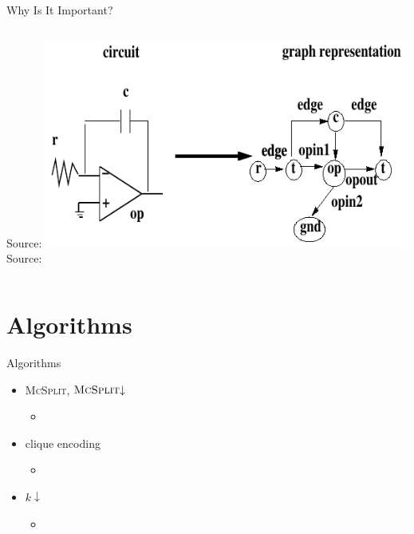\documentclass{beamer}
\begin{document}
\begin{frame}{Why Is It Important?}
\begin{columns}[t]
\begin{column}{0.5\textwidth}
      {\tiny Source: \cite{grindley}}
      \includegraphics[width=0.9\textwidth,height=0.4\textheight,keepaspectratio]{electronics2.png} \\[-7pt]
      {\tiny Source: \cite{617051}}
    \end{column}
  \end{columns}
\end{frame}

\section{Algorithms}

\begin{frame}{Algorithms}
  \begin{itemize}
  \item \textsc{McSplit}, $\textsc{McSplit}{\downarrow}$
    \begin{itemize}
    \item \cite{DBLP:conf/ijcai/McCreeshPT17}
    \end{itemize}
  \item clique encoding
    \begin{itemize}
    \item \cite{DBLP:conf/cp/McCreeshNPS16}
    \end{itemize}
  \item $k{\downarrow}$
    \begin{itemize}
    \item \cite{DBLP:conf/aaai/HoffmannMR17}
    \end{itemize}
  \end{itemize}
\end{frame}
\end{document}
